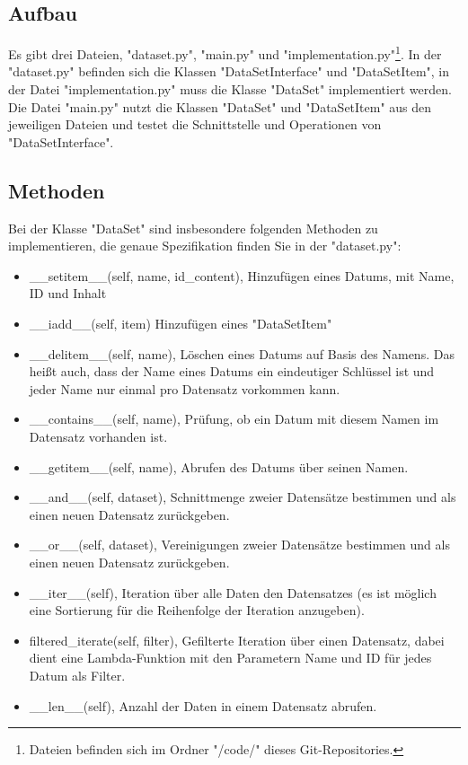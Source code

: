 \documentclass[
	12pt,
	a4paper,
	parskip=full
]{article}
\begin{document}
		\subsection{Aufbau}
			Es gibt drei Dateien, "dataset.py", "main.py" und "implementation.py"\footnote{Dateien befinden sich im Ordner "/code/" dieses Git-Repositories.}.
			In der "dataset.py" befinden sich die Klassen "DataSetInterface" und "DataSetItem",
			in der Datei "implementation.py" muss die Klasse "DataSet" implementiert werden.
			Die Datei "main.py" nutzt die Klassen "DataSet" und "DataSetItem" aus den jeweiligen Dateien und testet die Schnittstelle und Operationen von "DataSetInterface".\\
		
		\subsection{Methoden}
			Bei der Klasse "DataSet" sind insbesondere folgenden Methoden zu implementieren, die genaue Spezifikation finden Sie in der "dataset.py":\\
			\begin{itemize}
  				\item \_\_setitem\_\_(self, name, id\_content),
					 Hinzufügen eines Datums, mit Name, ID und Inhalt
	  			\item \_\_iadd\_\_(self, item)
					Hinzufügen eines "DataSetItem"
				\item \_\_delitem\_\_(self, name),
					Löschen eines Datums auf Basis des Namens.
					Das heißt auch, dass der Name eines Datums ein eindeutiger Schlüssel ist und jeder Name nur einmal pro Datensatz vorkommen kann.
				\item \_\_contains\_\_(self, name),
					Prüfung, ob ein Datum mit diesem Namen im Datensatz vorhanden ist.
				\item \_\_getitem\_\_(self, name),
					Abrufen des Datums über seinen Namen.\
				\item \_\_and\_\_(self, dataset),
					Schnittmenge zweier Datensätze bestimmen und als einen neuen Datensatz zurückgeben.
				\item \_\_or\_\_(self, dataset),
					Vereinigungen zweier Datensätze bestimmen und als einen neuen Datensatz zurückgeben.
				\item \_\_iter\_\_(self),
					Iteration über alle Daten den Datensatzes (es ist möglich eine Sortierung für die Reihenfolge der Iteration anzugeben).
				\item filtered\_iterate(self, filter),
					Gefilterte Iteration über einen Datensatz, dabei dient eine Lambda-Funktion mit den Parametern Name und ID für jedes Datum als Filter.
				\item \_\_len\_\_(self),
					Anzahl der Daten in einem Datensatz abrufen.
			\end{itemize}
\end{document}
